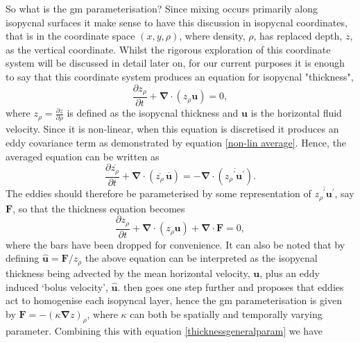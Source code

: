 \documentclass[10pt,a4paper]{article}
\newcommand*\mean[1]{\overline{#1}}
\newcommand*\res[1]{{#1}^{\prime}}
\begin{document}
 So what is the \gls{gm} parameterisation? Since mixing occurs primarily
 along isopycnal surfaces it make sense to have this discussion in
 isopycnal coordinates, that is in the coordinate space $(x,y,\rho)$,
  where density, $\rho$, has replaced depth, $z$, as the vertical
  coordinate. Whilst the rigorous exploration of this coordinate system
  will be discussed in detail later on, for our current purposes 
  it is enough to say that this coordinate system produces an equation
  for isopycnal "thickness",
  \begin{equation}
  \frac{\partial z_{\rho}}{\partial t} + \boldsymbol{\nabla}\cdot\left(z_{\rho}\boldsymbol{u}\right) = 0,
  \end{equation}
  where $z_{\rho} = \frac{\partial z}{\partial \rho}$ is defined as the
   isopycnal thickness and $\boldsymbol{u}$ is the horizontal fluid
   velocity. Since it is non-linear, when this equation is discretised
   it produces an eddy covariance term as demonstrated by equation
   \ref{non-lin average}. Hence, the averaged equation can be written as
     \begin{equation}
     \frac{\partial \mean{z_{\rho}}}{\partial t} + \boldsymbol{\nabla}\cdot\left(\mean{z_{\rho}} \, \mean{\boldsymbol{u}}\right) = - \boldsymbol{\nabla}\cdot\left(\mean{\res{z_{\rho}} \res{\boldsymbol{u}}}\right).
     \label{meancont}
     \end{equation}
   The eddies should therefore be parameterised by some representation
   of $\mean{\res{z_{\rho}} \res{\boldsymbol{u}}}$, say $\boldsymbol{F}$,
   so that the thickness equation becomes
     \begin{equation}
     \frac{\partial z_{\rho}}{\partial t} + \boldsymbol{\nabla}\cdot\left(z_{\rho}\boldsymbol{u}\right) + \boldsymbol{\nabla}\cdot\boldsymbol{F} = 0,
     \label{thicknessgeneralparam}
     \end{equation}
    where the bars have been dropped for convenience. It can also 
    be noted that by defining $\hat{\boldsymbol{u}} = \boldsymbol{F}/z_{\rho}$ the above equation can be interpreted as
    the isopycnal thickness
    being advected by the mean horizontal velocity, $\boldsymbol{u}$, 
    plus an eddy induced
    `bolus velocity', $\hat{\boldsymbol{u}}$. \cite{gent1990} then goes one
    step further and proposes that eddies act to homogenise each
    isopyncal layer, hence the 
    \gls{gm} parameterisation is given by $\boldsymbol{F} = - \left(\kappa
    \boldsymbol{\nabla} z \right)_{\rho}$, where $\kappa$ can both be
     spatially and temporally varying parameter. Combining this with equation \ref{thicknessgeneralparam} we have
\end{document}
